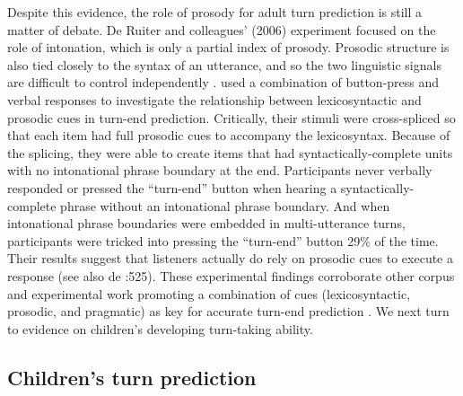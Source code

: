 \documentclass[authoryear, 12pt]{elsarticle}
\begin{document}
Despite this evidence, the role of prosody for adult turn prediction is still a matter of debate. De Ruiter and colleagues' (2006) experiment focused on the role of intonation, which is only a partial index of prosody. Prosodic structure is also tied closely to the syntax of an utterance, and so the two linguistic signals are difficult to control independently \citep{ford1996}. \citet*{torreira2015} used a combination of button-press and verbal responses to investigate the relationship between lexicosyntactic and prosodic cues in turn-end prediction. Critically, their stimuli were cross-spliced so that each item had full prosodic cues to accompany the lexicosyntax. Because of the splicing, they were able to create items that had syntactically-complete units with no intonational phrase boundary at the end. Participants never verbally responded or pressed the ``turn-end'' button when hearing a syntactically-complete phrase without an intonational phrase boundary. And when intonational phrase boundaries were embedded in multi-utterance turns, participants were tricked into pressing the ``turn-end'' button 29\% of the time. Their results suggest that listeners actually do rely on prosodic cues to execute a response (see also de \citet{de-ruiter2006}:525). These experimental findings corroborate other corpus and experimental work promoting a combination of cues (lexicosyntactic, prosodic, and pragmatic) as key for accurate turn-end prediction \citep{duncan1972, ford1996, hirvenkari2013}. We next turn to evidence on children's developing turn-taking ability.

\subsection{Children's turn prediction}


\end{document}
